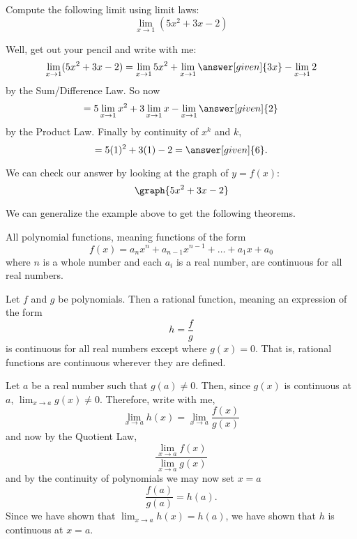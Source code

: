 \documentclass{ximera}
\begin{document}
\begin{example}
  Compute the following limit using limit laws:
  \[
  \displaystyle\lim_{x\to 1}(5x^2+3x-2)
  \]
\begin{explanation}
  Well, get out your pencil and write with me:
  \[
  \displaystyle\lim_{x\to 1} (5x^2+3x-2) = \lim_{x\to 1} 5x^2 + \lim_{x\to 1} \answer[given]{3x} - \lim_{x\to 1}2
  \]
  by the Sum/Difference Law. So now
  \[
  = 5\displaystyle\lim_{x\to 1} x^2 + 3\lim_{x\to 1} x - \lim_{x\to 1}\answer[given]{2}
  \]
  by the Product Law. Finally by continuity of $x^k$ and $k$,
  \[
  = 5(1)^2 + 3(1) - 2 =\answer[given]{6}.
  \]
  \begin{prompt}
    We can check our answer by looking at the graph of $y=f(x)$:
    \[
    \graph{5x^2+3x-2}
    \]
  \end{prompt}
\end{explanation}  
\end{example}

We can generalize the example above to get the following theorems.

\begin{theorem}
  All polynomial functions, meaning functions of the form
  \[
  f(x) = a_nx^n + a_{n-1}x^{n-1} + \dots + a_1 x + a_0
  \]
  where $n$ is a whole number and each $a_i$ is a real number, are
  continuous for all real numbers.
\end{theorem}

\begin{theorem}
  Let $f$ and $g$ be polynomials.  Then a rational function, meaning an
  expression of the form
  \[
  h=\frac{f}{g}
  \]
  is continuous for all real numbers except where $g(x)=0$.  That is,
  rational functions are continuous wherever they are defined.
\begin{explanation}
      Let $a$ be a real number such that $g(a)\neq 0$.  Then, since
      $g(x)$ is continuous at $a$, $\displaystyle\lim_{x\to a} g(x) \neq 0$.
      Therefore, write with me, 
      \[
      \displaystyle\lim_{x \to a} h(x) = \lim_{x\to a} \frac{f(x)}{g(x)}
      \]
      and now by the Quotient Law, 
      \[
      \displaystyle\frac{\lim_{x\to a} f(x)}{\displaystyle \lim_{x\to a} g(x)}
      \]
      and by the continuity of polynomials we may now set $x=a$
      \[
      \frac{f(a)}{g(a)}=h(a).
      \]
      Since we have shown that $\displaystyle\lim_{x\to a} h(x) = h(a)$, we have
      shown that $h$ is continuous at $x=a$.
\end{explanation}
\end{theorem}
\end{document}
